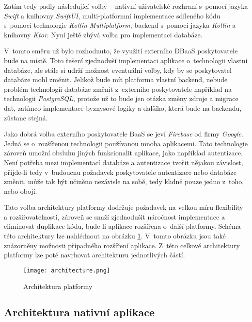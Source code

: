 Zatím tedy padly následující volby – nativní uživatelské rozhraní s~pomocí jazyka \emph{Swift} a knihovny \emph{SwiftUI}, multi-platformní implementace sdíleného kódu s~pomocí technologie \emph{Kotlin Multiplatform}, backend s~pomocí jazyka \emph{Kotlin} a knihovny \emph{Ktor}. Nyní ještě zbývá volba pro implementaci databáze.

V~tomto směru už bylo rozhodnuto, že využití externího DBaaS poskytovatele bude na místě. Toto řešení zjednoduší implementaci aplikace o~technologii vlastní databáze, ale stále si udrží možnost eventuální volby, kdy by se poskytovatel databáze mohl změnit. Jelikož bude mít platforma vlastní backend, nebude problém technologii databáze změnit z~externího poskytovatele například na technologii \emph{PostgreSQL}, protože už to bude jen otázka změny zdroje a migrace dat, zatímco implementace byznysové logiky a dalšího, která bude na backendu, zůstane stejná.

Jako dobrá volba externího poskytovatele BaaS se jeví \emph{Firebase} \cite{firebase} od firmy \emph{Google}. Jedná se o~rozšířenou technologii používanou mnoha aplikacemi. Tato technologie zároveň umožní obsluhu jiných funkcionalit aplikace, jako například autentizace. Není potřeba mezi implementací databáze a autentizace tvořit nějakou závislost, přijde-li tedy v~budoucnu požadavek poskytovatele autentizace nebo databáze změnit, může tak být učiněno nezávisle na sobě, tedy klidně pouze jedno z~toho, nebo obojí.

Tato volba architektury platformy dodržuje požadavek na velkou míru flexibility a rozšiřovatelnosti, zároveň se snaží zjednodušit náročnost implementace a eliminovat duplikace kódu, bude-li aplikace rozšířena o~další platformy. Schéma této architektury lze nahlédnout na obrázku \ref{fig:architecture}. V~tomto obrázku jsou také znázorněny možnosti případného rozšíření aplikace. Z~této celkové architektury platformy lze poté navrhovat architekturu jednotlivých částí.

\begin{figure}[h]
	\centering
	\texttt{[image: architecture.png]}
	\caption{Architektura platformy}
	\label{fig:architecture}
\end{figure}

\subsection{Architektura nativní aplikace}

